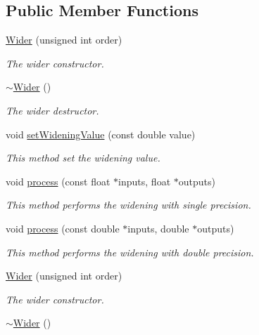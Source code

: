 \subsection*{Public Member Functions}
\begin{DoxyCompactItemize}
\item 
\hyperlink{class_hoa3_d_1_1_wider_a7f1f80e3329872d06f8e81f60f24e102}{Wider} (unsigned int order)
\begin{DoxyCompactList}\small\item\em The wider constructor. \end{DoxyCompactList}\item 
\hyperlink{class_hoa3_d_1_1_wider_a4a2770414c2753a9c92740f02641db38}{$\sim$\-Wider} ()
\begin{DoxyCompactList}\small\item\em The wider destructor. \end{DoxyCompactList}\item 
void \hyperlink{class_hoa3_d_1_1_wider_a5981d4dafbb0d2ce4ea20ec7cd1fb114}{set\-Widening\-Value} (const double value)
\begin{DoxyCompactList}\small\item\em This method set the widening value. \end{DoxyCompactList}\item 
void \hyperlink{class_hoa3_d_1_1_wider_a605d68c56ca7a541a9e91bd2aa9a9ea0}{process} (const float $\ast$inputs, float $\ast$outputs)
\begin{DoxyCompactList}\small\item\em This method performs the widening with single precision. \end{DoxyCompactList}\item 
void \hyperlink{class_hoa3_d_1_1_wider_a94fa445b540cbafeaafa05d4ed1a20bf}{process} (const double $\ast$inputs, double $\ast$outputs)
\begin{DoxyCompactList}\small\item\em This method performs the widening with double precision. \end{DoxyCompactList}\item 
\hyperlink{class_hoa3_d_1_1_wider_a7f1f80e3329872d06f8e81f60f24e102}{Wider} (unsigned int order)
\begin{DoxyCompactList}\small\item\em The wider constructor. \end{DoxyCompactList}\item 
\hyperlink{class_hoa3_d_1_1_wider_a4a2770414c2753a9c92740f02641db38}{$\sim$\-Wider} ()

\end{DoxyCompactItemize}
